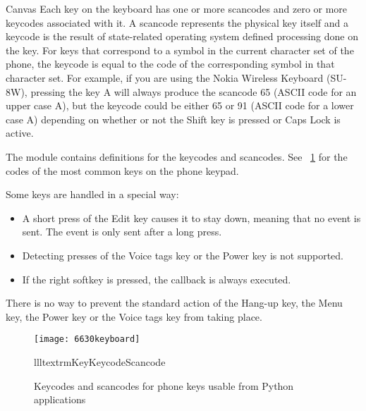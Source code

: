 \begin{classdesc}{Canvas}{}
Each key on the keyboard has one or more scancodes and zero or more keycodes 
associated with it. A scancode represents the physical key itself and a 
keycode is the result of state-related operating system defined processing 
done on the key. For keys that correspond to a symbol in the current 
character set of the phone, the keycode is equal to the code of the 
corresponding symbol in that character set. For example, if you are using 
the Nokia Wireless Keyboard (SU-8W), pressing the key A will always produce 
the scancode 65 (ASCII code for an upper case A), but the keycode 
could be either 65 or 91 (ASCII code for a lower case A) depending on 
whether or not the Shift key is pressed or Caps Lock is active. 

The  module contains definitions for the keycodes and 
scancodes. See \figurename~\ref{fig:keyboard} for the codes of the most 
common keys on the phone keypad. 

Some keys are handled in a special way:

\begin{itemize}
\item A short press of the Edit key causes it to stay down, meaning that no  event is sent. The event is only sent after a long press.
\item Detecting presses of the Voice tags key or the Power key is not supported.
\item If the right softkey is pressed, the  callback is always executed.
\end{itemize}

There is no way to prevent the standard action of the Hang-up key, the Menu 
key, the Power key or the Voice tags key from taking place.

\begin{figure}
\centering
\texttt{[image: 6630keyboard]}
\begin{tableiii}{lll}{textrm}{Key}{Keycode}{Scancode}
\end{tableiii}
\caption{Keycodes and scancodes for phone keys usable from Python applications}
\label{fig:keyboard}
\end{figure}

\end{classdesc}

